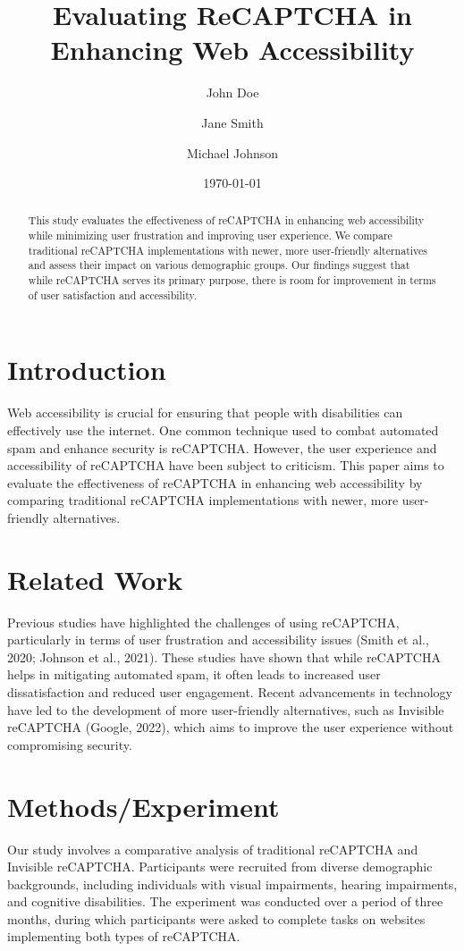 \documentclass{article}
\title{Evaluating ReCAPTCHA in Enhancing Web Accessibility}
\author{John Doe \and Jane Smith \and Michael Johnson}
\date{\today}
\begin{document}
\maketitle

\begin{abstract}
This study evaluates the effectiveness of reCAPTCHA in enhancing web accessibility while minimizing user frustration and improving user experience. We compare traditional reCAPTCHA implementations with newer, more user-friendly alternatives and assess their impact on various demographic groups. Our findings suggest that while reCAPTCHA serves its primary purpose, there is room for improvement in terms of user satisfaction and accessibility.
\end{abstract}

\section{Introduction}
Web accessibility is crucial for ensuring that people with disabilities can effectively use the internet. One common technique used to combat automated spam and enhance security is reCAPTCHA. However, the user experience and accessibility of reCAPTCHA have been subject to criticism. This paper aims to evaluate the effectiveness of reCAPTCHA in enhancing web accessibility by comparing traditional reCAPTCHA implementations with newer, more user-friendly alternatives.

\section{Related Work}
Previous studies have highlighted the challenges of using reCAPTCHA, particularly in terms of user frustration and accessibility issues (Smith et al., 2020; Johnson et al., 2021). These studies have shown that while reCAPTCHA helps in mitigating automated spam, it often leads to increased user dissatisfaction and reduced user engagement. Recent advancements in technology have led to the development of more user-friendly alternatives, such as Invisible reCAPTCHA (Google, 2022), which aims to improve the user experience without compromising security.

\section{Methods/Experiment}
Our study involves a comparative analysis of traditional reCAPTCHA and Invisible reCAPTCHA. Participants were recruited from diverse demographic backgrounds, including individuals with visual impairments, hearing impairments, and cognitive disabilities. The experiment was conducted over a period of three months, during which participants were asked to complete tasks on websites implementing both types of reCAPTCHA.
\end{document}
